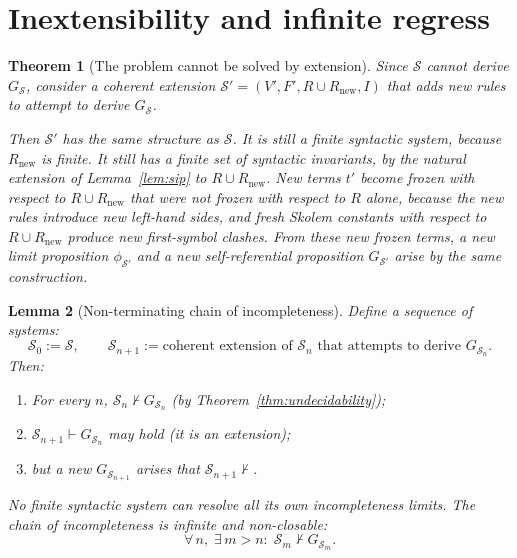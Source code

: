 \documentclass[11pt]{article}
\newtheorem{theorem}{Theorem}[section]
\newtheorem{lemma}[theorem]{Lemma}
\begin{document}
\section{Inextensibility and infinite regress}
\label{sec:inextensibility}


\begin{theorem}[The problem cannot be solved by extension]
\label{thm:inextensibility}
Since $\mathcal{S}$ cannot derive $G_{\mathcal{S}}$, consider a coherent
extension $\mathcal{S}' = (V', F', R \cup R_{\mathrm{new}}, I)$ that
adds new rules to attempt to derive $G_{\mathcal{S}}$.

Then $\mathcal{S}'$ has the same structure as $\mathcal{S}$.
It is still a finite syntactic system, because $R_{\mathrm{new}}$ is
finite. It still has a finite set of syntactic invariants, by the
natural extension of Lemma~\ref{lem:sip} to $R \cup R_{\mathrm{new}}$.
New terms $t'$ become frozen with respect to
$R \cup R_{\mathrm{new}}$ that were not frozen with respect to $R$
alone, because the new rules introduce new left-hand sides, and fresh
Skolem constants with respect to $R \cup R_{\mathrm{new}}$ produce new
first-symbol clashes. From these new frozen terms, a new limit
proposition $\phi_{\mathcal{S}'}$ and a new self-referential proposition
$G_{\mathcal{S}'}$ arise by the same construction.
\end{theorem}

\begin{lemma}[Non-terminating chain of incompleteness]
\label{lem:chain}
Define a sequence of systems:
\[
  \mathcal{S}_0 := \mathcal{S},
  \qquad
  \mathcal{S}_{n+1} := \text{coherent extension of } \mathcal{S}_n
  \text{ that attempts to derive } G_{\mathcal{S}_n}.
\]
Then:
\begin{enumerate}
  \item For every $n$, $\mathcal{S}_n \not\vdash G_{\mathcal{S}_n}$ (by
        Theorem~\ref{thm:undecidability});
  \item $\mathcal{S}_{n+1} \vdash G_{\mathcal{S}_n}$ may hold (it is an
        extension);
  \item but a new $G_{\mathcal{S}_{n+1}}$ arises that
        $\mathcal{S}_{n+1} \not\vdash$.
\end{enumerate}

No finite syntactic system can resolve all its own incompleteness limits.
The chain of incompleteness is infinite and non-closable:
\[
  \forall\, n,\;\exists\, m > n :\;
  \mathcal{S}_m \not\vdash G_{\mathcal{S}_m}.
\]
\end{lemma}
\end{document}
